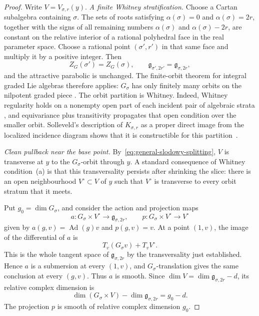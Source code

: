 \documentclass[11pt]{amsart}
\theoremstyle{definition}
\theoremstyle{remark}
\begin{document}
\begin{proof}
Write $V=V_{\sigma,r}(y)$.
\smallskip
\noindent\emph{A finite Whitney stratification.}
Choose a Cartan subalgebra containing $\sigma$.  The sets of roots satisfying
$\alpha(\sigma)=0$ and $\alpha(\sigma)=2r$, together with the signs of all
remaining numbers $\alpha(\sigma)$ and $\alpha(\sigma)-2r$, are constant on
the relative interior of a rational polyhedral face in the real parameter
space.  Choose a rational point $(\sigma',r')$ in that same face and multiply
it by a positive integer.  Then
\[
 Z_G(\sigma')=Z_G(\sigma),\qquad
 \mathfrak g_{\sigma',2r'}=\mathfrak g_{\sigma,2r},
\]
and the attractive parabolic is unchanged.  The finite-orbit theorem for
integral graded Lie algebras therefore applies: $G_\sigma$ has only
finitely many orbits on the nilpotent graded piece
\cite[Section~2.1]{LusztigGraded}.  The orbit
partition is Whitney.  Indeed, Whitney regularity holds on a nonempty open
part of each incident pair of algebraic strata
\cite[Lemma~19.3]{Whitney}, and equivariance plus
transitivity propagates that open condition over the smaller orbit.
Solleveld's description of $K_{\sigma,r}$ as a proper direct image from the
localized incidence diagram shows that it is constructible for this
partition~\cite[Section~2.1 and Section~4]{Solleveld}.

\smallskip
\noindent\emph{Clean pullback near the base point.}
By~\eqref{eq:general-slodowy-splitting}, $V$ is transverse at $y$ to the
$G_\sigma$-orbit through $y$.  A standard consequence of Whitney
condition~(a) is that this transversality persists after shrinking the
slice: there is an open neighbourhood $V^\circ\subset V$ of $y$ such that
$V^\circ$ is transverse to every orbit stratum that it meets.

Put $g_0=\dim G_\sigma$, and consider the action and projection maps
\[
 a:G_\sigma\times V^\circ\longrightarrow\mathfrak g_{\sigma,2r},
 \qquad p:G_\sigma\times V^\circ\longrightarrow V^\circ
\]
given by $a(g,v)=\operatorname{Ad}(g)v$ and $p(g,v)=v$.  At a point
$(1,v)$, the image of the differential of $a$ is
\[
 T_v(G_\sigma v)+T_vV^\circ.
\]
This is the whole tangent space of $\mathfrak g_{\sigma,2r}$ by the
transversality just established.  Hence $a$ is a submersion at every
$(1,v)$, and $G_\sigma$-translation gives the same conclusion at every
$(g,v)$.  Thus $a$ is smooth.  Since
$\dim V=\dim\mathfrak g_{\sigma,2r}-d$, its relative complex dimension is
\[
 \dim(G_\sigma\times V)-\dim\mathfrak g_{\sigma,2r}=g_0-d.
\]
The projection $p$ is smooth of relative complex dimension $g_0$.


\end{proof}
\end{document}
